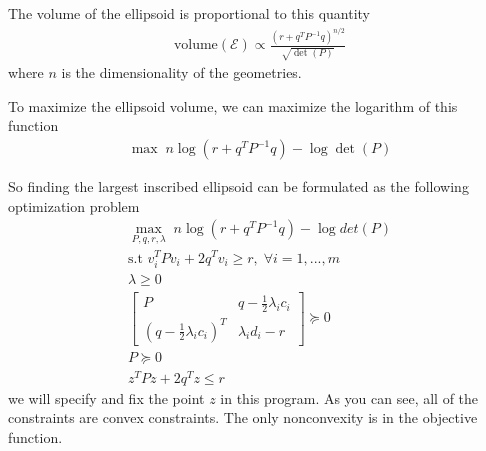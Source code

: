 \documentclass{article}
\begin{document}
The volume of the ellipsoid is proportional to this quantity
\begin{align}
	\text{volume}(\mathcal{E})\propto \frac{(r + q^TP^{-1}q)^{n/2}}{\sqrt{\det{(P)}}}
\end{align}
where $n$ is the dimensionality of the geometries.

To maximize the ellipsoid volume, we can maximize the logarithm of this function
\begin{align}
	\max\; n\log(r+q^TP^{-1}q) - \log \det(P)
\end{align}

So finding the largest inscribed ellipsoid can be formulated as the following optimization problem
\begin{subequations}
\begin{align}
	\max_{P, q, r, \lambda}\; n\log(r+q^TP^{-1}q) - \log det(P)\label{eq:nonconvex_objective1}\\
	\text{s.t } v_i^TPv_i + 2q^Tv_i\ge r,\;\forall i=1,..., m\\
	\lambda \ge 0\\
	\begin{bmatrix}
P  & q-\frac{1}{2}\lambda_i c_i\\
		(q-\frac{1}{2}\lambda_i c_i)^T & \lambda_id_i-r
	\end{bmatrix}\succeq 0\\
	P\succeq 0\\
	z^TPz + 2q^Tz\le r
\end{align}
\label{eq:nonconvex_optimization}
\end{subequations}
we will specify and fix the point $z$ in this program. As you can see, all of the constraints are convex constraints. The only nonconvexity is in the objective function.
\end{document}
